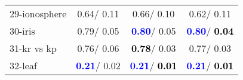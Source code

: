 \begin{table}[h]
\begin{center}
\begin{tabular}{lc|c|c}
29-ionosphere &   0.64/  0.11 &   0.66/  0.10 &   0.62/  0.11 \\
30-iris &   0.79/  0.05 & \textcolor{blue}{\textbf{  0.80}}/  0.05 & \textcolor{blue}{\textbf{  0.80}}/\textcolor{black}{\textbf{  0.04}} \\
31-kr vs kp &   0.76/  0.06 & \textcolor{black}{\textbf{  0.78}}/  0.03 &   0.77/  0.03 \\
32-leaf & \textcolor{blue}{\textbf{  0.21}}/  0.02 & \textcolor{blue}{\textbf{  0.21}}/\textcolor{black}{\textbf{  0.01}} & \textcolor{blue}{\textbf{  0.21}}/\textcolor{black}{\textbf{  0.01}} \\\end{tabular}\label{stratsALCKappa0bC4.5wRedux}
\end{center}
\end{table}
